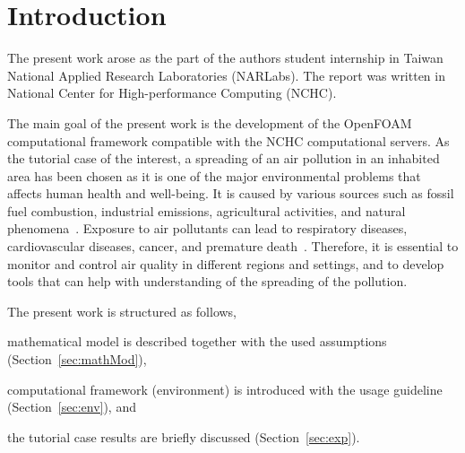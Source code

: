 \cleardoublepage
{}
\section{Introduction}
\label{sec:intro}

The present work arose as the part of the authors student internship in Taiwan National Applied Research Laboratories (NARLabs). The report was written in National Center for High-performance Computing (NCHC). 

The main goal of the present work is the development of the OpenFOAM computational framework compatible with the NCHC computational servers. As the tutorial case of the interest, a spreading of an air pollution in an inhabited area has been chosen as it is one of the major environmental problems that affects human health and well-being. It is caused by various sources such as fossil fuel combustion, industrial emissions, agricultural activities, and natural phenomena~\cite{chen14}. Exposure to air pollutants can lead to respiratory diseases, cardiovascular diseases, cancer, and premature death~\cite{cohen17}. Therefore, it is essential to monitor and control air quality in different regions and settings, and to develop tools that can help with understanding of the spreading of the pollution.

The present work is structured as follows, 
\begin{inparaenum}[(i)]
    \item mathematical model is described together with the used assumptions (Section~\ref{sec:mathMod}), 
    \item computational framework (environment) is introduced with the usage guideline (Section~\ref{sec:env}), and
    \item the tutorial case results are briefly discussed (Section~\ref{sec:exp}).
\end{inparaenum}

